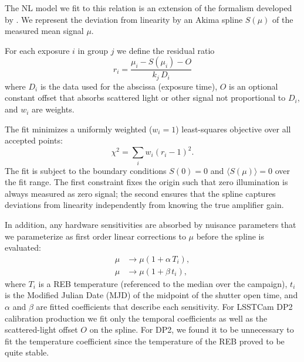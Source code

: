 The NL model we fit to this relation is an extension of the formalism developed by \citet{2019A&A...629A..36A}.
We represent the deviation from linearity by an Akima spline $S(\mu)$ of the measured mean signal $\mu$.

For each exposure $i$ in group $j$ we define the residual ratio
\begin{equation}
    r_i = \frac{\mu_i - S(\mu_i) - O}{k_j\, D_{i}}
    \label{eq:spline-nl-fit}
\end{equation}
where $D_{i}$ is the data used for the abscissa (exposure time), $O$ is an optional constant offset that absorbs scattered light or other signal not proportional to $D_{i}$, and $w_i$ are weights.

The fit minimizes a uniformly weighted ($w_i = 1$) least-squares objective over all accepted points:
\begin{equation}
    \chi^2 = \sum_{i} w_i \left(r_i - 1\right)^2. \label{eq:linearity-chisq}
\end{equation}
The fit is subject to the boundary conditions $S(0) = 0$ and $\langle S(\mu)\rangle = 0$ over the fit range.
The first constraint fixes the origin such that zero illumination is always measured as zero signal; the second ensures that the spline captures deviations from linearity independently from knowing the true amplifier gain.

In addition, any hardware sensitivities are absorbed by nuisance parameters that we parameterize as first order linear corrections to $\mu$ before the spline is evaluated:
\begin{equation}
\begin{aligned}
    \mu &\rightarrow \mu \left(1 + \alpha\, T_i\right), \\
    \mu &\rightarrow \mu \left(1 + \beta\, t_i\right),
\end{aligned}
\label{eq:linearity-nuisance}
\end{equation}
where $T_i$ is a REB temperature (referenced to the median over the campaign), $t_i$ is the Modified Julian Date (MJD) of the midpoint of the shutter open time, and $\alpha$ and $\beta$ are fitted coefficients that describe each sensitivity.
For LSSTCam DP2 calibration production we fit only the temporal coefficients as well as the scattered-light offset $O$ on the spline.
For DP2, we found it to be unnecessary to fit the temperature coefficient since the temperature of the REB proved to be quite stable. 

